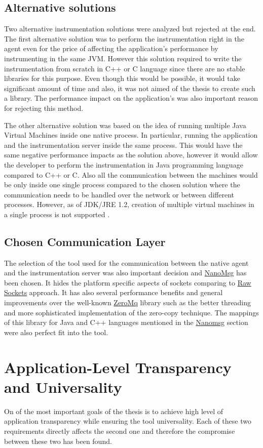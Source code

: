 \subsection{Alternative solutions}
Two alternative instrumentation solutions were analyzed but rejected at the end. The first alternative solution was to perform the instrumentation right in the agent even for the price of affecting the application's performance by instrumenting in the same JVM. However this solution required to write the instrumentation from scratch in C++ or C language since there are no stable libraries for this purpose. Even though this would be possible, it would take significant amount of time and also, it was not aimed of the thesis to create such a library. The performance impact on the application's was also important reason for rejecting this method.

The other alternative solution was based on the idea of running multiple Java Virtual Machines inside one native process. In particular, running the application and the instrumentation server inside the same process. This would have the same  negative performance impacts as the solution above, however it would allow the developer to perform the instrumentation in Java programming language compared to C++ or C. Also all the communication between the machines would be only inside one single process compared to the chosen solution where the communication needs to be handled over the network or between different processes. However, as of JDK/JRE 1.2, creation of multiple virtual machines in a single process is not supported \cite{MoreJVMOnceProccess}.
							
\subsection{Chosen Communication Layer}
The selection of the tool used for the communication between the native agent and the instrumentation server was also important decision and \hyperref[nanomsg]{NanoMsg} has been chosen. It hides the platform specific aspects of sockets comparing to \hyperref[raw_sockets]{Raw Sockets} approach. It has also several performance benefits and general improvements over the well-known \hyperref[zeromq]{ZeroMq} library such as the better threading and more sophisticated implementation of the zero-copy technique. The mappings of this library for Java and C++ languages mentioned in the \hyperref[nanomsg]{Nanomsg} section were also perfect fit into the tool.
		

\section{Application-Level Transparency and Universality}
On of the most important goals of the thesis is to achieve high level of application transparency while ensuring the tool universality. Each of these two requirements directly affects the second one and therefore the compromise between these two has been found.


